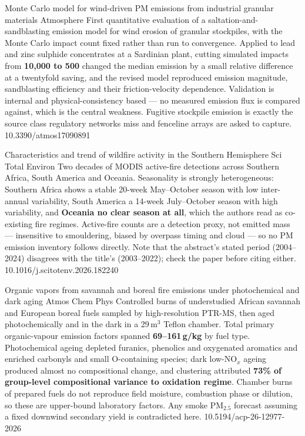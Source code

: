 \documentclass[10pt]{article}
\begin{document}
{Monte Carlo model for wind-driven PM emissions from industrial granular materials}
{Atmosphere}
{First quantitative evaluation of a saltation-and-sandblasting emission model for wind
erosion of granular stockpiles, with the Monte Carlo impact count fixed rather than run
to convergence. Applied to lead and zinc sulphide concentrates at a Sardinian plant,
cutting simulated impacts from \textbf{10{,}000 to 500} changed the median emission by a
small relative difference at a twentyfold saving, and the revised model reproduced
emission magnitude, sandblasting efficiency and their friction-velocity dependence.
Validation is internal and physical-consistency based --- no measured emission flux is
compared against, which is the central weakness. Fugitive stockpile emission is exactly
the source class regulatory networks miss and fenceline arrays are asked to capture.}
{10.3390/atmos17090891}

{Characteristics and trend of wildfire activity in the Southern Hemisphere}
{Sci Total Environ}
{Two decades of MODIS active-fire detections across Southern Africa, South America and
Oceania. Seasonality is strongly heterogeneous: Southern Africa shows a stable 20-week
May--October season with low inter-annual variability, South America a 14-week
July--October season with high variability, and \textbf{Oceania no clear season at all},
which the authors read as co-existing fire regimes. Active-fire counts are a detection
proxy, not emitted mass --- insensitive to smouldering, biased by overpass timing and
cloud --- so no PM emission inventory follows directly. Note that the abstract's stated
period (2004--2024) disagrees with the title's (2003--2022); check the paper before citing
either.}
{10.1016/j.scitotenv.2026.182240}

{Organic vapors from savannah and boreal fire emissions under photochemical and dark aging}
{Atmos Chem Phys}
{Controlled burns of understudied African savannah and European boreal fuels sampled by
high-resolution PTR-MS, then aged photochemically and in the dark in a 29\,m$^3$ Teflon
chamber. Total primary organic-vapour emission factors spanned \textbf{69--161\,g/kg} by
fuel type. Photochemical ageing depleted furanics, phenolics and oxygenated aromatics and
enriched carbonyls and small O-containing species; dark low-NO$_x$ ageing produced almost
no compositional change, and clustering attributed \textbf{73\% of group-level
compositional variance to oxidation regime}. Chamber burns of prepared fuels do not
reproduce field moisture, combustion phase or dilution, so these are upper-bound
laboratory factors. Any smoke PM$_{2.5}$ forecast assuming a fixed downwind secondary yield
is contradicted here.}
{10.5194/acp-26-12977-2026}
\end{document}
